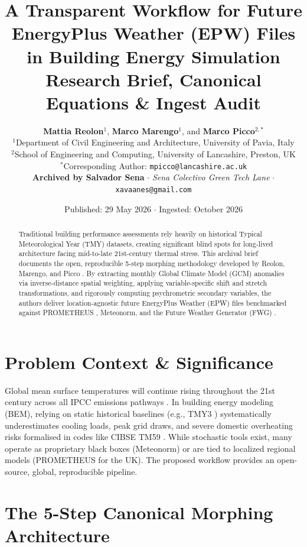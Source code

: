 \documentclass[10pt,a4paper]{article}
\title{\LARGE\textbf{\textcolor{primary}{A Transparent Workflow for Future EnergyPlus Weather (EPW) Files in Building Energy Simulation}}\\[0.4em]
\large\textsf{Research Brief, Canonical Equations \& Ingest Audit}}
\author{\textbf{Mattia Reolon}$^1$, \textbf{Marco Marengo}$^1$, and \textbf{Marco Picco}$^{2,*}$\\[0.3em]
\small $^1$Department of Civil Engineering and Architecture, University of Pavia, Italy\\
\small $^2$School of Engineering and Computing, University of Lancashire, Preston, UK\\
\small $^*$Corresponding Author: \texttt{mpicco@lancashire.ac.uk}\\[0.5em]
\small \textbf{Archived by Salvador Sena} $\cdot$ \textit{Sena Colectivo Green Tech Lane} $\cdot$ \texttt{xavaanes@gmail.com}}
\date{Published: 29 May 2026 $\cdot$ Ingested: October 2026}
\begin{document}
\maketitle

\begin{abstract}
Traditional building performance assessments rely heavily on historical Typical Meteorological Year (TMY) datasets, creating significant blind spots for long-lived architecture facing mid-to-late 21st-century thermal stress. This archival brief documents the open, reproducible 5-step morphing methodology developed by Reolon, Marengo, and Picco \cite{Reolon2026_EnergyPlusWeather}. By extracting monthly Global Climate Model (GCM) anomalies via inverse-distance spatial weighting, applying variable-specific shift and stretch transformations, and rigorously computing psychrometric secondary variables, the authors deliver location-agnostic future EnergyPlus Weather (EPW) files benchmarked against PROMETHEUS \cite{Eames2011_Prometheus}, Meteonorm, and the Future Weather Generator (FWG) \cite{Rodrigues2023_FWG}.
\end{abstract}

\section{Problem Context \& Significance}
Global mean surface temperatures will continue rising throughout the 21st century across all IPCC emissions pathways \cite{IPCC2021_AR6_WGI}. In building energy modeling (BEM), relying on static historical baselines (e.g., TMY3 \cite{Belcher2005_Morphing}) systematically underestimates cooling loads, peak grid draws, and severe domestic overheating risks formalised in codes like CIBSE TM59 \cite{CIBSE_TM59}.
While stochastic tools exist, many operate as proprietary black boxes (Meteonorm) or are tied to localized regional models (PROMETHEUS for the UK). The proposed workflow provides an open-source, global, reproducible pipeline.

\section{The 5-Step Canonical Morphing Architecture}
\end{document}
